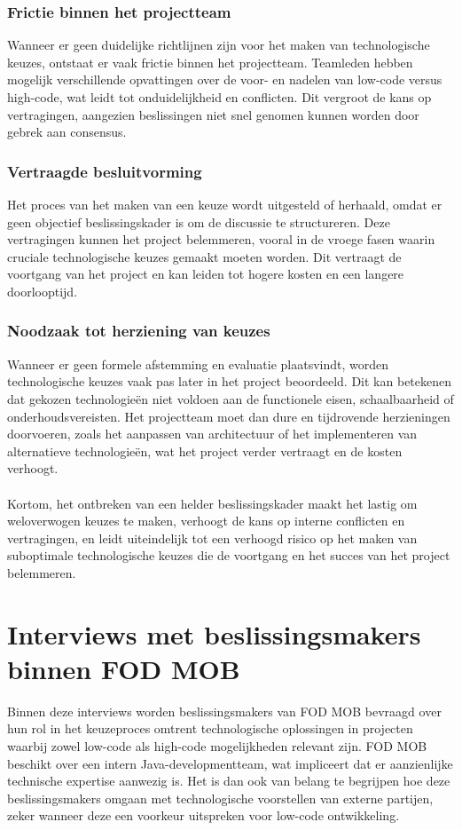 \subsubsection{Frictie binnen het projectteam}
Wanneer er geen duidelijke richtlijnen zijn voor het maken van technologische keuzes, ontstaat er vaak frictie binnen het projectteam. Teamleden hebben mogelijk verschillende opvattingen over de voor- en nadelen van low-code versus high-code, wat leidt tot onduidelijkheid en conflicten. Dit vergroot de kans op vertragingen, aangezien beslissingen niet snel genomen kunnen worden door gebrek aan consensus.
\subsubsection{Vertraagde besluitvorming}
Het proces van het maken van een keuze wordt uitgesteld of herhaald, omdat er geen objectief beslissingskader is om de discussie te structureren. Deze vertragingen kunnen het project belemmeren, vooral in de vroege fasen waarin cruciale technologische keuzes gemaakt moeten worden. Dit vertraagt de voortgang van het project en kan leiden tot hogere kosten en een langere doorlooptijd.
\subsubsection{Noodzaak tot herziening van keuzes}
Wanneer er geen formele afstemming en evaluatie plaatsvindt, worden technologische keuzes vaak pas later in het project beoordeeld. Dit kan betekenen dat gekozen technologieën niet voldoen aan de functionele eisen, schaalbaarheid of onderhoudsvereisten. Het projectteam moet dan dure en tijdrovende herzieningen doorvoeren, zoals het aanpassen van architectuur of het implementeren van alternatieve technologieën, wat het project verder vertraagt en de kosten verhoogt.
\\
\\
Kortom, het ontbreken van een helder beslissingskader maakt het lastig om weloverwogen keuzes te maken, verhoogt de kans op interne conflicten en vertragingen, en leidt uiteindelijk tot een verhoogd risico op het maken van suboptimale technologische keuzes die de voortgang en het succes van het project belemmeren.

\section{Interviews met beslissingsmakers binnen \gls{FOD MOB}}

Binnen deze interviews worden beslissingsmakers van \gls{FOD MOB} bevraagd over hun rol in het keuzeproces omtrent technologische oplossingen in projecten waarbij zowel low-code als high-code mogelijkheden relevant zijn. \gls{FOD MOB} beschikt over een intern Java-developmentteam, wat impliceert dat er aanzienlijke technische expertise aanwezig is. Het is dan ook van belang te begrijpen hoe deze beslissingsmakers omgaan met technologische voorstellen van externe partijen, zeker wanneer deze een voorkeur uitspreken voor low-code ontwikkeling.

